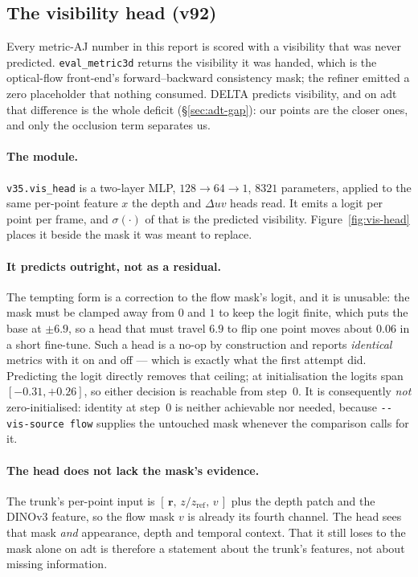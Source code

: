 \documentclass[11pt,a4paper]{article}
\begin{document}
\subsection{The visibility head (v92)}
\label{sec:vis-head}
Every metric-AJ number in this report is scored with a visibility that was never predicted.
\texttt{eval\_metric3d} returns the visibility it was handed, which is the optical-flow
front-end's forward--backward consistency mask; the refiner emitted a zero placeholder that
nothing consumed. DELTA predicts visibility, and on adt that difference is the whole deficit
(\S\ref{sec:adt-gap}): our points are the closer ones, and only the occlusion term separates us.

\paragraph{The module.} \texttt{v35.vis\_head} is a two-layer MLP, $128\to64\to1$, $8321$
parameters, applied to the same per-point feature $x$ the depth and $\Delta uv$ heads read. It
emits a logit per point per frame, and $\sigma(\cdot)$ of that is the predicted visibility.
Figure~\ref{fig:vis-head} places it beside the mask it was meant to replace.

\paragraph{It predicts outright, not as a residual.} The tempting form is a correction to the
flow mask's logit, and it is unusable: the mask must be clamped away from $0$ and $1$ to keep the
logit finite, which puts the base at $\pm6.9$, so a head that must travel $6.9$ to flip one point
moves about $0.06$ in a short fine-tune. Such a head is a no-op by construction and reports
\emph{identical} metrics with it on and off --- which is exactly what the first attempt did.
Predicting the logit directly removes that ceiling; at initialisation the logits span
$[-0.31,+0.26]$, so either decision is reachable from step~0. It is consequently \emph{not}
zero-initialised: identity at step~0 is neither achievable nor needed, because
\texttt{-{}-vis-source flow} supplies the untouched mask whenever the comparison calls for it.

\paragraph{The head does not lack the mask's evidence.} The trunk's per-point input is
$[\,\mathbf{r},\,z/z_{\text{ref}},\,v\,]$ plus the depth patch and the DINOv3 feature, so the flow
mask $v$ is already its fourth channel. The head sees that mask \emph{and} appearance, depth and
temporal context. That it still loses to the mask alone on adt is therefore a statement about the
trunk's features, not about missing information.
\end{document}
